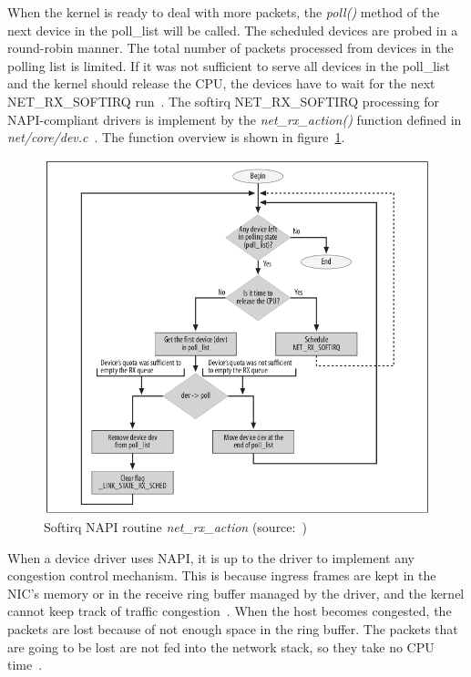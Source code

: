 When the kernel is ready to deal with more packets, the {\it{poll()}} method of the next device
in the poll\_list will be called.
The scheduled devices are probed in a round-robin manner.
The total number of packets processed from devices in the polling list is limited.
If it was not sufficient to serve all devices in the poll\_list and the kernel should release the CPU,
the devices have to wait for the next NET\_RX\_SOFTIRQ run~\cite{understanding-internals}.
The softirq NET\_RX\_SOFTIRQ processing for NAPI-compliant drivers
is implement by the {\it{net\_rx\_action()}} function defined in {\it{net/core/dev.c}}~\cite{kernel-source}.
The function overview is shown in figure~\ref{fig:linux-softirq-napi}.

\begin{figure}
	\centering
	\includegraphics[width=14.5cm,keepaspectratio]{fig/net_rq_softirq.png}
	\caption{Softirq NAPI routine {\it{net\_rx\_action}} (source:~\cite{understanding-internals})}
	\label{fig:linux-softirq-napi}
\end{figure}

When a device driver uses NAPI, it is up to
the driver to implement any congestion control mechanism.
This is because ingress frames are kept in the NIC's memory or in the receive ring buffer managed by the driver,
and the kernel cannot keep track of traffic congestion~\cite{understanding-internals}.
When the host becomes congested, the packets are lost because of not enough space in the ring buffer.
The packets that are going to be lost are not fed into the network stack, so they take no CPU time~\cite{haifux-lecture}.

